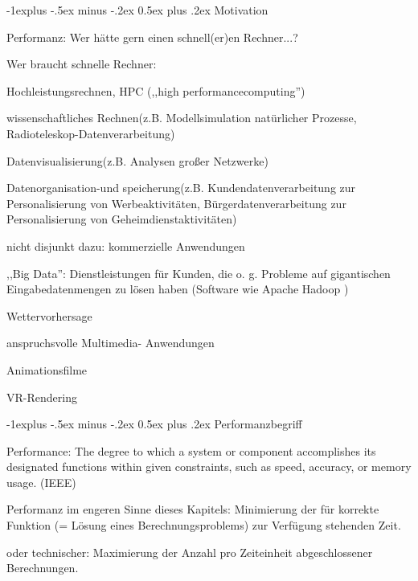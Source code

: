\documentclass[a4paper]{article}
\makeatletter
\renewcommand{\subsection}{\@startsection{subsection}{2}{0mm}%
 {-1explus -.5ex minus -.2ex}%
 {0.5ex plus .2ex}%
 {\normalfont\normalsize\bfseries}}
\makeatother
\begin{document}
\begin{multicols}{3}
    \subsection{Motivation}

    \begin{itemize*}
        \item Performanz: Wer hätte gern einen schnell(er)en Rechner...?
        \item Wer braucht schnelle Rechner:
        \begin{itemize*}
            \item Hochleistungsrechnen, HPC (,,high performancecomputing'') \begin{itemize*} \item wissenschaftliches Rechnen(z.B. Modellsimulation natürlicher Prozesse, Radioteleskop-Datenverarbeitung) \item Datenvisualisierung(z.B. Analysen großer Netzwerke) \item Datenorganisation-und speicherung(z.B. Kundendatenverarbeitung zur Personalisierung von Werbeaktivitäten, Bürgerdatenverarbeitung zur Personalisierung von Geheimdienstaktivitäten) \end{itemize*}
            \item nicht disjunkt dazu: kommerzielle Anwendungen \begin{itemize*} \item ,,Big Data'': Dienstleistungen für Kunden, die o. g. Probleme auf gigantischen Eingabedatenmengen zu lösen haben (Software wie Apache Hadoop ) \item Wettervorhersage \end{itemize*}
            \item anspruchsvolle Multimedia- Anwendungen \begin{itemize*} \item Animationsfilme \item VR-Rendering \end{itemize*}
        \end{itemize*}
    \end{itemize*}


    \subsection{Performanzbegriff}

    \begin{itemize*}
        \item Performance: The degree to which a system or component accomplishes
        its designated functions within given constraints, such as speed,
        accuracy, or memory usage. (IEEE)
        \item Performanz im engeren Sinne dieses Kapitels: Minimierung der für
        korrekte Funktion (= Lösung eines Berechnungsproblems) zur Verfügung
        stehenden Zeit.
        \item oder technischer: Maximierung der Anzahl pro Zeiteinheit
        abgeschlossener Berechnungen.
    \end{itemize*}



\end{multicols}
\end{document}
